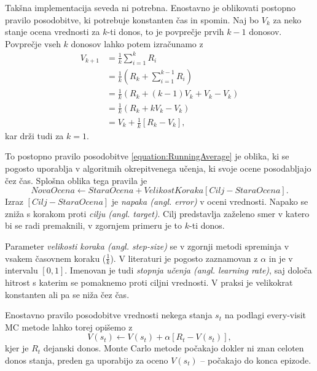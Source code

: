\documentclass[a4paper, oneside, 12pt]{report}
\begin{document}
Takšna implementacija seveda ni potrebna. Enostavno je oblikovati postopno pravilo posodobitve, ki potrebuje konstanten čas in spomin. Naj bo $V_k$ za neko stanje ocena vrednosti za $k$-ti donos, to je povprečje prvih $k - 1$ donosov. Povprečje vseh $k$ donosov lahko potem izračunamo z
\begin{align} \label{equation:RunningAverage}
V_{k+1} &= \frac{1}{k} \sum_{i=1}^k R_i \nonumber \\
&= \frac{1}{k} \left(R_k + \sum_{i=1}^{k-1} R_i\right) \nonumber \\
&= \frac{1}{k} \left(R_k + (k - 1) V_k + V_k - V_k\right) \nonumber \\
&= \frac{1}{k} \left(R_k + kV_k - V_k\right) \nonumber \\
&= V_k + \frac{1}{k} \left[R_k - V_k\right],
\end{align}
kar drži tudi za $k = 1$.

To postopno pravilo posodobitve \eqref{equation:RunningAverage} je oblika, ki se pogosto uporablja v algoritmih okrepitvenega učenja, ki svoje ocene posodabljajo čez čas. Splošna oblika tega pravila je
\begin{equation}
NovaOcena \leftarrow StaraOcena + VelikostKoraka \left[Cilj - StaraOcena\right].
\end{equation}
Izraz $\left[Cilj - StaraOcena\right]$ je {\em napaka (angl. error)} v oceni vrednosti. Napako se zniža s korakom proti {\em cilju (angl. target)}. Cilj predstavlja zaželeno smer v katero bi se radi premaknili, v zgornjem primeru je to $k$-ti donos.

Parameter {\em velikosti koraka (angl. step-size)} se v zgornji metodi spreminja v vsakem časovnem koraku ($\frac{1}{k}$). V literaturi je pogosto zaznamovan z $\alpha$ in je v intervalu ${[0, 1]}$. Imenovan je tudi {\em stopnja učenja (angl. learning rate)}, saj določa hitrost s katerim se pomaknemo proti ciljni vrednosti. V praksi je velikokrat konstanten ali pa se niža čez čas.

Enostavno pravilo posodobitve vrednosti nekega stanja $s_t$ na podlagi every-visit MC metode lahko torej opišemo z
\begin{equation}
V(s_t) \gets V(s_t) + \alpha[R_t - V(s_t)],
\end{equation}
kjer je $R_t$ dejanski donos. Monte Carlo metode počakajo dokler ni znan celoten donos stanja, preden ga uporabijo za oceno $V(s_t)$ -- počakajo do konca epizode.
\end{document}
